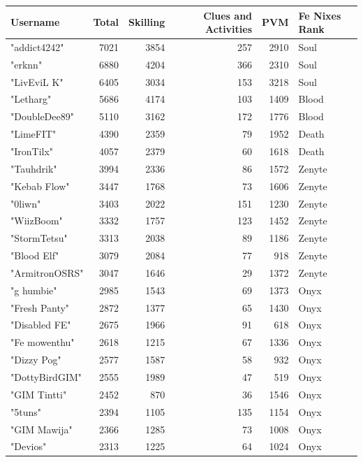 \documentclass{article}
\begin{document}
\begin{table}[htbp]
\centering
{}
\begin{tabular}{|l|r|r|r|r|l|}
\hline
\textbf{Username} & \textbf{Total} & \textbf{Skilling} & \textbf{Clues and Activities} & \textbf{PVM} & \textbf{Fe Nixes Rank} \\ \hline
"addict4242" & 7021 & 3854 & 257 & 2910 & Soul \\ \hline
"erknn" & 6880 & 4204 & 366 & 2310 & Soul \\ \hline
"LivEviL K" & 6405 & 3034 & 153 & 3218 & Soul \\ \hline
"Letharg" & 5686 & 4174 & 103 & 1409 & Blood \\ \hline
"DoubleDee89" & 5110 & 3162 & 172 & 1776 & Blood \\ \hline
"LimeFIT" & 4390 & 2359 & 79 & 1952 & Death \\ \hline
"IronTilx" & 4057 & 2379 & 60 & 1618 & Death \\ \hline
"Tauhdrik" & 3994 & 2336 & 86 & 1572 & Zenyte \\ \hline
"Kebab Flow" & 3447 & 1768 & 73 & 1606 & Zenyte \\ \hline
"0liwn" & 3403 & 2022 & 151 & 1230 & Zenyte \\ \hline
"WiizBoom" & 3332 & 1757 & 123 & 1452 & Zenyte \\ \hline
"StormTetsu" & 3313 & 2038 & 89 & 1186 & Zenyte \\ \hline
"Blood Elf" & 3079 & 2084 & 77 & 918 & Zenyte \\ \hline
"ArmitronOSRS" & 3047 & 1646 & 29 & 1372 & Zenyte \\ \hline
"g humbie" & 2985 & 1543 & 69 & 1373 & Onyx \\ \hline
"Fresh Panty" & 2872 & 1377 & 65 & 1430 & Onyx \\ \hline
"Disabled FE" & 2675 & 1966 & 91 & 618 & Onyx \\ \hline
"Fe mowenthu" & 2618 & 1215 & 67 & 1336 & Onyx \\ \hline
"Dizzy Pog" & 2577 & 1587 & 58 & 932 & Onyx \\ \hline
"DottyBirdGIM" & 2555 & 1989 & 47 & 519 & Onyx \\ \hline
"GIM Tintti" & 2452 & 870 & 36 & 1546 & Onyx \\ \hline
"5tuns" & 2394 & 1105 & 135 & 1154 & Onyx \\ \hline
"GIM Mawija" & 2366 & 1285 & 73 & 1008 & Onyx \\ \hline
"Devios" & 2313 & 1225 & 64 & 1024 & Onyx \\ \hline

\end{tabular}
\end{table}
\end{document}
